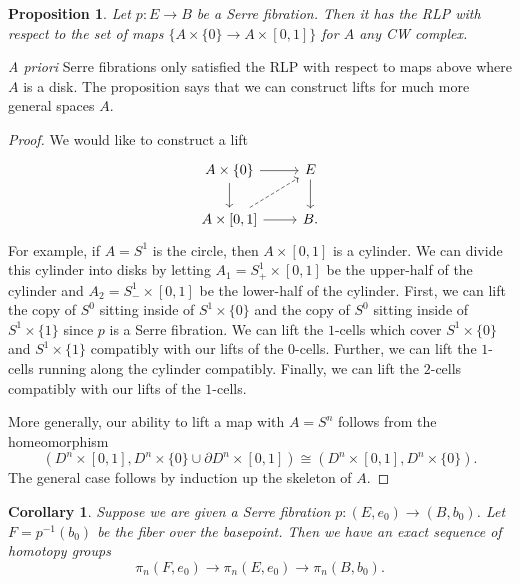 \documentclass{article}
\newtheorem{proposition}[theorem]{Proposition}
\newtheorem{corollary}[theorem]{Corollary}
\newtheorem{proposed work}[theorem]{Proposed Work}
\theoremstyle{definition}
\begin{document}
\begin{proposition}
Let $p : E \to B$ be a Serre fibration. Then it has the RLP with respect to the set of maps $\{A \times \{0\} \to A \times [0,1]\}$ for $A$ any CW complex. 
\end{proposition}

\emph{A priori} Serre fibrations only satisfied the RLP with respect to maps above where $A$ is a disk. The proposition says that we can construct lifts for much more general spaces $A$. 

\begin{proof}
We would like to construct a lift
\[
\begin{tikzcd}
A \times \{0 \} \arrow[r] \arrow[d] & E \arrow[d] \\
A \times [0,1] \arrow[r] \arrow[dashed,ur]  & B .
\end{tikzcd}
\]
For example, if $A = S^1$ is the circle, then $A \times [0,1]$ is a cylinder. We can divide this cylinder into disks by letting $A_1 = S^1_+ \times [0,1]$ be the upper-half of the cylinder and $A_2 = S^1_- \times [0,1]$ be the lower-half of the cylinder. First, we can lift the copy of $S^0$ sitting inside of $S^1 \times \{0\}$ and the copy of $S^0$ sitting inside of $S^1 \times \{1\}$ since $p$ is a Serre fibration. We can lift the $1$-cells which cover $S^1 \times \{0\}$ and $S^1 \times \{1\}$ compatibly with our lifts of the $0$-cells. Further, we can lift the $1$-cells running along the cylinder compatibly. Finally, we can lift the $2$-cells compatibly with our lifts of the $1$-cells. 

More generally, our ability to lift a map with $A = S^n$  follows from the homeomorphism
$$(D^n \times [0,1], D^n \times \{0\} \cup \partial D^n \times [0,1]) \cong (D^n \times [0,1], D^n \times \{0\}).$$
The general case follows by induction up the skeleton of $A$.  
\end{proof}

\begin{corollary}\label{sesfib}
Suppose we are given a Serre fibration $p : (E,e_0) \to (B,b_0)$. Let $F = p^{-1}(b_0)$ be the fiber over the basepoint. Then we have an exact sequence of homotopy groups
$$\pi_n(F,e_0) \to \pi_n(E,e_0) \to \pi_n(B,b_0).$$
\end{corollary}
\end{document}
